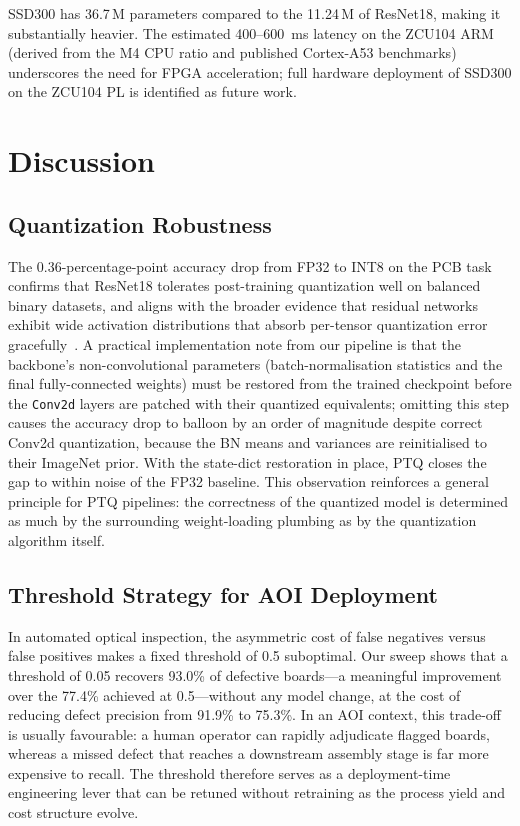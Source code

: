 \documentclass[conference]{IEEEtran}
\begin{document}
SSD300 has 36.7\,M parameters compared to the 11.24\,M of ResNet18, making it substantially heavier. The estimated 400--600~ms latency on the ZCU104 ARM (derived from the M4 CPU ratio and published Cortex-A53 benchmarks) underscores the need for FPGA acceleration; full hardware deployment of SSD300 on the ZCU104 PL is identified as future work.

\section{Discussion}
\label{sec:discussion}

\subsection{Quantization Robustness}

The 0.36-percentage-point accuracy drop from FP32 to INT8 on the PCB task confirms that ResNet18 tolerates post-training quantization well on balanced binary datasets, and aligns with the broader evidence that residual networks exhibit wide activation distributions that absorb per-tensor quantization error gracefully~\cite{jacob2018quantization}. A practical implementation note from our pipeline is that the backbone's non-convolutional parameters (batch-normalisation statistics and the final fully-connected weights) must be restored from the trained checkpoint before the \texttt{Conv2d} layers are patched with their quantized equivalents; omitting this step causes the accuracy drop to balloon by an order of magnitude despite correct Conv2d quantization, because the BN means and variances are reinitialised to their ImageNet prior. With the state-dict restoration in place, PTQ closes the gap to within noise of the FP32 baseline. This observation reinforces a general principle for PTQ pipelines: the correctness of the quantized model is determined as much by the surrounding weight-loading plumbing as by the quantization algorithm itself.

\subsection{Threshold Strategy for AOI Deployment}

In automated optical inspection, the asymmetric cost of false negatives versus false positives makes a fixed threshold of 0.5 suboptimal. Our sweep shows that a threshold of 0.05 recovers 93.0\% of defective boards---a meaningful improvement over the 77.4\% achieved at 0.5---without any model change, at the cost of reducing defect precision from 91.9\% to 75.3\%. In an AOI context, this trade-off is usually favourable: a human operator can rapidly adjudicate flagged boards, whereas a missed defect that reaches a downstream assembly stage is far more expensive to recall. The threshold therefore serves as a deployment-time engineering lever that can be retuned without retraining as the process yield and cost structure evolve.
\end{document}
